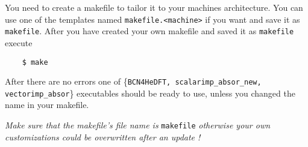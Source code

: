 \documentclass[10pt,a4paper]{article}
\begin{document}
	You need to create a makefile to tailor it to your machines architecture. You can use one of the templates named  \verb|makefile.<machine>| if you want and save it as \verb|makefile|. After you have created your own makefile and saved it as \verb|makefile| execute
	\begin{verbatim}
	$ make
	\end{verbatim}
	After there are no errors one of \{\verb|BCN4HeDFT, scalarimp_absor_new,| \\ \verb|vectorimp_absor|\} executables should be ready to use, unless you changed the name in your makefile.

\emph{Make sure that the makefile's file name is} \verb+makefile+ \emph{otherwise your own customizations could be overwritten after an update !}
\end{document}
